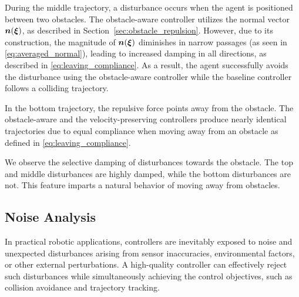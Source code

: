 During the middle trajectory, a disturbance occurs when the agent is positioned between two obstacles. The obstacle-aware controller utilizes the normal vector $\boldsymbol{n}(\boldsymbol{\xi})$, as described in Section~\ref{sec:obstacle_repulsion}. However, due to its construction, the magnitude of $\boldsymbol{n}(\boldsymbol{\xi})$ diminishes in narrow passages (as seen in \eqref{eq:averaged_normal}), leading to increased damping in all directions, as described in \eqref{eq:leaving_compliance}. As a result, the agent successfully avoids the disturbance using the obstacle-aware controller while the baseline controller follows a colliding trajectory.

In the bottom trajectory, the repulsive force points away from the obstacle. The obstacle-aware and the velocity-preserving controllers produce nearly identical trajectories due to equal compliance when moving away from an obstacle as defined in \eqref{eq:leaving_compliance}.

We observe the selective damping of disturbances towards the obstacle. The top and middle disturbances are highly damped, while the bottom disturbances are not. This feature imparts a natural behavior of moving away from obstacles.
\fi

\iflong
\subsection{Noise Analysis}
In practical robotic applications, controllers are inevitably exposed to noise and unexpected disturbances arising from sensor inaccuracies, environmental factors, or other external perturbations. A high-quality controller can effectively reject such disturbances while simultaneously achieving the control objectives, such as collision avoidance and trajectory tracking.

